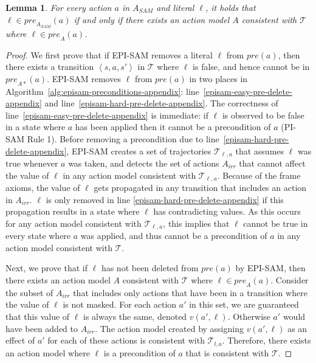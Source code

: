 \documentclass[letterpaper]{article} %
\newcommand{\tuple}[1]{\ensuremath{\left \langle #1 \right \rangle }}
\newcommand{\pre}{\textit{pre}}
\newcommand{\sam}{\textit{SAM}\xspace}
\newtheorem{lemma}{Lemma}
\begin{document}
\begin{lemma}\label{lem:pre-strong-appendix}
For every action $a$ in $A_\sam$ and literal $\ell$, it holds that 
$\ell\in\pre_{A_\sam}(a)$ if and only if there exists an action model $A$ consistent with $\mathcal{T}$ where $\ell\in\pre_A(a)$. 
\end{lemma}
\begin{proof}
We first prove that if EPI-SAM removes a literal $\ell$ from $\pre(a)$, then there exists a transition $\tuple{s,a,s'}$ in $\mathcal{T}$ where $\ell$ is false, and hence cannot be in $\pre_{A*}(a)$. 
EPI-SAM removes $\ell$ from $\pre(a)$ in two places in Algorithm~\ref{alg:episam-preconditions-appendix}: line~\ref{episam-easy-pre-delete-appendix} and line~\ref{episam-hard-pre-delete-appendix}. 
The correctness of line~\ref{episam-easy-pre-delete-appendix} is immediate: if $\ell$ is observed to be false in a state where $a$ has been applied then it cannot be a precondition of $a$ (PI-SAM Rule 1). 
Before removing a precondition due to line~\ref{episam-hard-pre-delete-appendix}, 
EPI-SAM creates a set of trajectories $\mathcal{T}_{\ell,a}$ that assumes $\ell$ was true whenever $a$ was taken, 
and detects the set of actions $A_{irr}$ that cannot affect the value of $\ell$ in any action model consistent with $\mathcal{T}_{\ell,a}$. 
Because of the frame axioms, the value of $\ell$ gets propagated in any transition that includes an action in $A_{irr}$. $\ell$ is only removed in line \ref{episam-hard-pre-delete-appendix} if this propagation results in a state where $\ell$ has contradicting values. As this occurs for any action model consistent with $\mathcal{T}_{\ell,a}$, this implies that $\ell$ cannot be true in every state where $a$ was applied, and thus cannot be a precondition of $a$ in any action model consistent with $\mathcal{T}$. 



Next, we prove that if $\ell$ has not been deleted from $\pre(a)$ by EPI-SAM, then there exists an action model $A$ consistent with $\mathcal{T}$ where $\ell\in\pre_A(a)$. 
Consider the subset of $A_{irr}$ that includes only actions that have been in a transition where the value of $\ell$ is not masked. 
For each action $a'$ in this set, we are guaranteed that this value of $\ell$ is always the same, denoted $v(a',\ell)$. Otherwise $a'$ would have been added to $A_{irr}$. 
The action model created by assigning $v(a',\ell)$ as an effect of $a'$ for each of these actions is consistent with $\mathcal{T}_{l,a}$. 
Therefore, there exists an action model where $\ell$ is a precondition of $a$ that is consistent with $\mathcal{T}$. 
\end{proof}
\end{document}
